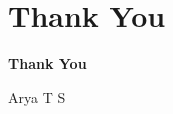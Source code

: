 \section{Thank You}

\begin{frame}

\centering

\vspace{1.5cm}

{\Huge \textbf{Thank You}}

\vspace{0.3cm}

{\normalsize Arya T S}

\end{frame}